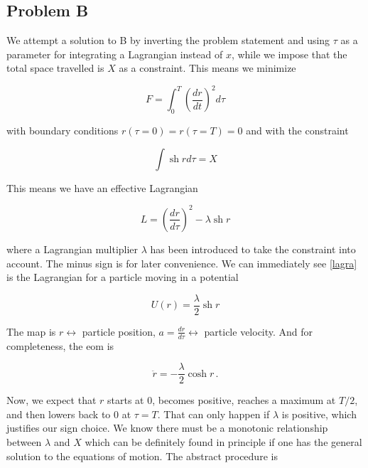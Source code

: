 \documentclass{article}
\newcommand{\tder}[2]{\frac{d#1}{d#2}}
\renewcommand{\sinh}{\operatorname{sh}}
\begin{document}
\subsection*{Problem B}

We attempt a solution to B by inverting the problem statement and using $\tau$ as a parameter for integrating a Lagrangian instead of $x$, while we impose that the total space travelled is $X$ as a constraint. This means we minimize

\begin{equation}
	F = \int_0^T \left( \tder{r}{t} \right)^2 d\tau 
	\label{}
\end{equation}

with boundary conditions $r(\tau=0) = r(\tau=T) = 0$ and with the constraint

\begin{equation}
	\int \sinh r d\tau = X
	\label{}
\end{equation}

This means we have an effective Lagrangian 

\begin{equation}
	L = \left( \tder{r}{\tau} \right)^2 - \lambda \sinh r
	\label{lagra}
\end{equation}

where a Lagrangian multiplier $\lambda$ has been introduced to take the constraint into account. The minus sign is for later convenience. We can immediately see \eqref{lagra} is the Lagrangian for a particle moving in a potential

\begin{equation}
	U(r) = \frac{\lambda}{2} \sinh r
	\label{}
\end{equation}

The map is $r \leftrightarrow$ particle position, $a = \tder{r}{\tau} \leftrightarrow$ particle velocity. And for completeness, the eom is

\begin{equation}
	\ddot r = - \frac{\lambda}{2} \cosh r\,.
	\label{}
\end{equation}

Now, we expect that $r$ starts at $0$, becomes positive, reaches a maximum at $T/2$, and then lowers back to $0$ at $\tau = T$. That can only happen if $\lambda$ is positive, which justifies our sign choice. We know there must be a monotonic relationship between $\lambda$ and $X$ which can be definitely found in principle if one has the general solution to the equations of motion. The abstract procedure is
\end{document}
